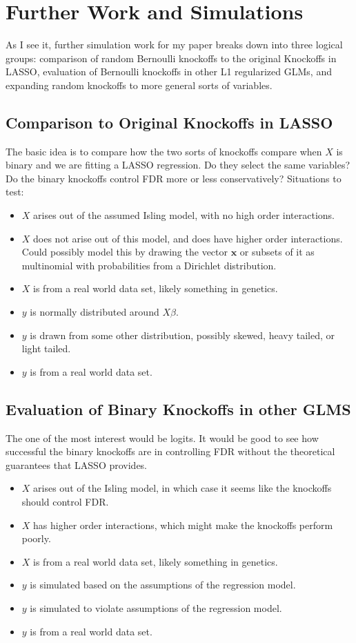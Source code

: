 \documentclass[11pt]{article}
\theoremstyle{definition}
\begin{document}
\section{Further Work and Simulations}
As I see it, further simulation work for my paper breaks down into three logical groups: comparison of random Bernoulli knockoffs to the original Knockoffs in LASSO, evaluation of Bernoulli knockoffs in other L1 regularized GLMs, and expanding random knockoffs to more general sorts of variables.

\subsection{Comparison to Original Knockoffs in LASSO}
The basic idea is to compare how the two sorts of knockoffs compare when $X$ is binary and we are fitting a LASSO regression. Do they select the same variables? Do the binary knockoffs control FDR more or less conservatively? Situations to test:
\begin{itemize}
    \item $X$ arises out of the assumed Isling model, with no high order interactions. 
    \item $X$ does not arise out of this model, and does have higher order interactions. Could possibly model this by drawing the vector $\mathbf x$ or subsets of it as multinomial with probabilities from a Dirichlet distribution.
    \item $X$ is from a real world data set, likely something in genetics.
    \item $y$ is normally distributed around $X\beta$.
    \item $y$ is drawn from some other distribution, possibly skewed, heavy tailed, or light tailed.
    \item $y$ is from a real world data set.
\end{itemize}

\subsection{Evaluation of Binary Knockoffs in other GLMS}
The one of the most interest would be logits. It would be good to see how successful the binary knockoffs are in controlling FDR without the theoretical guarantees that LASSO provides.
\begin{itemize}
    \item $X$ arises out of the Isling model, in which case it seems like the knockoffs should control FDR.
    \item $X$ has higher order interactions, which might make the knockoffs perform poorly.
    \item $X$ is from a real world data set, likely something in genetics.
    \item $y$ is simulated based on the assumptions of the regression model.
    \item $y$ is simulated to violate assumptions of the regression model.
    \item $y$ is from a real world data set.
\end{itemize}
\end{document}
